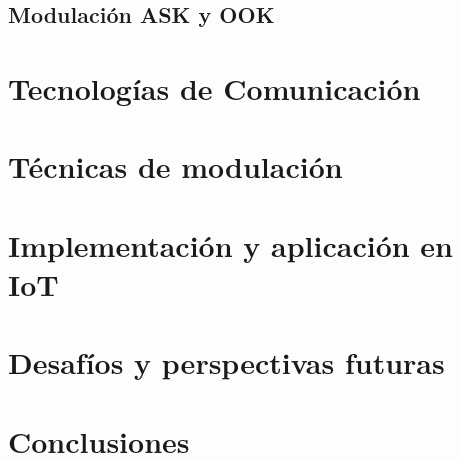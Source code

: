 \documentclass[12pt, letterpaper]{article}
\begin{document}
\subsection{Modulación ASK y OOK}


\newpage
\section{Tecnologías de Comunicación}

\newpage
\section{Técnicas de modulación}

\newpage
\section{Implementación y aplicación en IoT}

\newpage
\section{Desafíos y perspectivas futuras}

\newpage
\section{Conclusiones}
\end{document}
